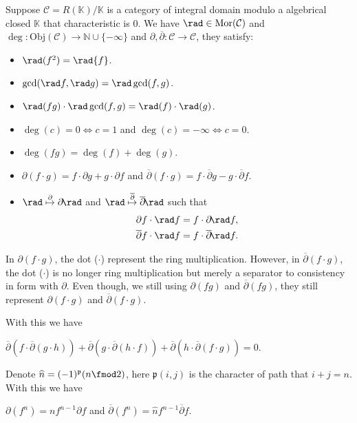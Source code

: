 \begin{definition}
	Suppose $\mathcal{C} = R(\mathbb{K})/\mathbb{K}$ is a category of integral domain modulo a algebrical closed $\mathbb{K}$ that characteristic is $0$. We have $\rad \in \mathrm{Mor}(\mathcal{C})$ and $\deg: \mathrm{Obj}(\mathcal{C})\to \mathbb{N}\cup\{-\infty\}$ and $\partial, \overline{\partial}: \mathcal{C} \to \mathcal{C}$, they satisfy:
	\begin{itemize}
		\item[1.] $\rad(f^{2}) = \rad{f}$.
		\item[2.] $\gcd(\rad f, \rad g) = \rad\gcd(f, g)$.
		\item[3.] $\rad (fg)\cdot\rad\gcd(f, g) = \rad(f)\cdot\rad(g)$.
		\item[4.] $\deg(c) = 0 \Longleftrightarrow c = 1$ and $\deg(c) = -\infty \Longleftrightarrow c = 0$.
		\item[5.] $\deg (fg) = \deg(f) + \deg(g)$.
		\item[6.] $\partial(f\cdot g) = f\cdot\partial{g} + g\cdot\partial{f}$ and $\overline{\partial}(f \cdot g) = f\cdot\overline{\partial}{g} - g\cdot\overline{\partial}{f}$.
		\item[7.] $\rad \overset{\partial}{\mapsto} \partial\!\rad$ and $\rad \overset{\overline{\partial}}{\mapsto} \overline{\partial}\!\rad$ such that
		\begin{align*}
			\partial f \cdot \rad f &= f \cdot \partial\!\rad f, \\
			\overline{\partial} f \cdot \rad f &= f \cdot \overline{\partial}\!\rad f.
		\end{align*}
	\end{itemize}
\end{definition}
\begin{remark}
	In $\partial(f\cdot g)$, the dot ($\cdot$) represent the ring multiplication. However, in $\overline{\partial}(f\cdot g)$, the dot ($\cdot$) is no longer ring multiplication but merely a separator to consistency in form with $\partial$. Even though, we still using $\partial(fg)$ and $\overline{\partial}(fg)$, they still represent $\partial(f\cdot g)$ and $\overline{\partial}(f\cdot g)$.
\end{remark}
With this we have
\begin{proposition}
	$\overline{\partial}(f\cdot\overline{\partial}(g\cdot h)) + \overline{\partial}(g\cdot\overline{\partial}(h\cdot f)) + \overline{\partial}(h\cdot\overline{\partial}(f\cdot g)) = 0$.
\end{proposition}
Denote $\widehat{n} = (-1)^{\mathfrak{p}}(n\fmod 2)$, here $\mathfrak{p}(i,j)$ is the character of path that $i + j = n$. With this we have
\begin{proposition}
	$\partial(f^{n}) = nf^{n-1}\partial f$ and $\overline{\partial}(f^{n}) = \widehat{n}f^{n-1}\overline{\partial}f$.
\end{proposition}
	
